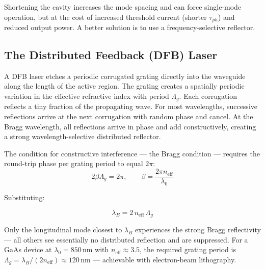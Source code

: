 Shortening the cavity increases the mode spacing and can force single-mode operation, but at the cost of increased threshold current (shorter $\tau_{ph}$) and reduced output power. A better solution is to use a frequency-selective reflector.

\subsection{The Distributed Feedback (DFB) Laser}

A DFB laser etches a periodic corrugated grating directly into the waveguide along the length of the active region. The grating creates a spatially periodic variation in the effective refractive index with period $\Lambda_g$. Each corrugation reflects a tiny fraction of the propagating wave. For most wavelengths, successive reflections arrive at the next corrugation with random phase and cancel. At the Bragg wavelength, all reflections arrive in phase and add constructively, creating a strong wavelength-selective distributed reflector.

The condition for constructive interference — the Bragg condition — requires the round-trip phase per grating period to equal $2\pi$:
\begin{equation*}
    2\beta\Lambda_g = 2\pi, \qquad \beta = \frac{2\pi n_\text{eff}}{\lambda_0}
\end{equation*}

Substituting:
\begin{keyresult}
    \begin{equation}
        \lambda_B = 2\,n_\text{eff}\,\Lambda_g
    \end{equation}
\end{keyresult}

Only the longitudinal mode closest to $\lambda_B$ experiences the strong Bragg reflectivity — all others see essentially no distributed reflection and are suppressed. For a GaAs device at $\lambda_0 = 850\,\text{nm}$ with $n_\text{eff} \approx 3.5$, the required grating period is $\Lambda_g = \lambda_B/(2n_\text{eff}) \approx 120\,\text{nm}$ — achievable with electron-beam lithography.

